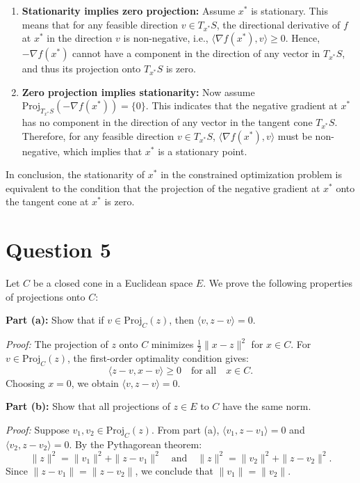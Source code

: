 \documentclass[12p]{article}
\begin{document}
\begin{enumerate}
    \item \textbf{Stationarity implies zero projection:} Assume \( x^* \) is stationary. This means that for any feasible direction \( v \in T_{x^*}S \), the directional derivative of \( f \) at \( x^* \) in the direction \( v \) is non-negative, i.e., \( \langle \nabla f(x^*), v \rangle \geq 0 \). Hence, \( -\nabla f(x^*) \) cannot have a component in the direction of any vector in \( T_{x^*}S \), and thus its projection onto \( T_{x^*}S \) is zero.

    \item \textbf{Zero projection implies stationarity:} Now assume \( \text{Proj}_{T_{x^*}S}(-\nabla f(x^*)) = \{0\} \). This indicates that the negative gradient at \( x^* \) has no component in the direction of any vector in the tangent cone \( T_{x^*}S \). Therefore, for any feasible direction \( v \in T_{x^*}S \), \( \langle \nabla f(x^*), v \rangle \) must be non-negative, which implies that \( x^* \) is a stationary point.
\end{enumerate}

In conclusion, the stationarity of \( x^* \) in the constrained optimization problem is equivalent to the condition that the projection of the negative gradient at \( x^* \) onto the tangent cone at \( x^* \) is zero.

\section*{Question 5} 


Let \( C \) be a closed cone in a Euclidean space \( E \). We prove the following properties of projections onto \( C \):

\textbf{Part (a):} Show that if \( v \in \text{Proj}_C(z) \), then \( \langle v, z - v \rangle = 0 \).

\textit{Proof:} The projection of \( z \) onto \( C \) minimizes \( \frac{1}{2}\|x - z\|^2 \) for \( x \in C \). For \( v \in \text{Proj}_C(z) \), the first-order optimality condition gives:
\[
\langle z - v, x - v \rangle \geq 0 \quad \text{for all} \quad x \in C.
\]
Choosing \( x = 0 \), we obtain \( \langle v, z - v \rangle = 0 \).

\textbf{Part (b):} Show that all projections of \( z \in E \) to \( C \) have the same norm.

\textit{Proof:} Suppose \( v_1, v_2 \in \text{Proj}_C(z) \). From part (a), \( \langle v_1, z - v_1 \rangle = 0 \) and \( \langle v_2, z - v_2 \rangle = 0 \). By the Pythagorean theorem:
\[
\|z\|^2 = \|v_1\|^2 + \|z - v_1\|^2 \quad \text{and} \quad \|z\|^2 = \|v_2\|^2 + \|z - v_2\|^2.
\]
Since \( \|z - v_1\| = \|z - v_2\| \), we conclude that \( \|v_1\| = \|v_2\| \).
\end{document}
